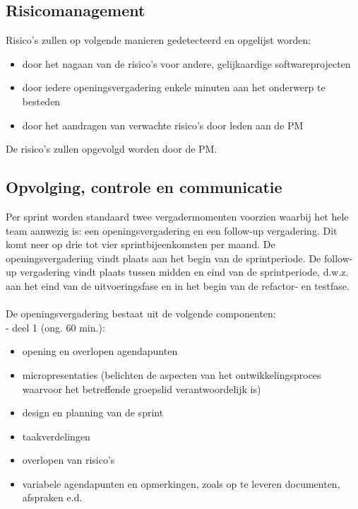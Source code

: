 \documentclass{article}
\begin{document}
\subsection{Risicomanagement}
\label{subsec:risico}
Risico's zullen op volgende manieren gedetecteerd en opgelijst worden:

\begin{itemize}
\item door het nagaan van de risico's voor andere, gelijkaardige softwareprojecten
\item door iedere openingsvergadering enkele minuten aan het onderwerp te besteden 
\item door het aandragen van verwachte risico's door leden aan de PM 
\end{itemize}

De risico's zullen opgevolgd worden door de PM. \newline




\subsection{Opvolging, controle en communicatie}

Per sprint worden standaard twee vergadermomenten voorzien waarbij het hele team aanwezig is: een openingsvergadering en een follow-up vergadering. Dit komt neer op drie tot vier sprintbijeenkomsten per maand. De openingsvergadering vindt plaats aan het begin van de sprintperiode. De follow-up vergadering vindt plaats tussen midden en eind van de sprintperiode, d.w.z. aan het eind van de uitvoeringsfase en in het begin van de refactor- en testfase.\\
\\
\noindent De openingsvergadering bestaat uit de volgende componenten: \\
- deel 1 (ong. 60 min.):
\begin{itemize}
\item opening en overlopen agendapunten
\item micropresentaties (belichten de aspecten van het ontwikkelingsproces waarvoor het betreffende groepslid verantwoordelijk is)
\item design en planning van de sprint
\item taakverdelingen
\item overlopen van risico's
\item variabele agendapunten en opmerkingen, zoals op te leveren documenten, afspraken e.d.
\end{itemize}
\end{document}
